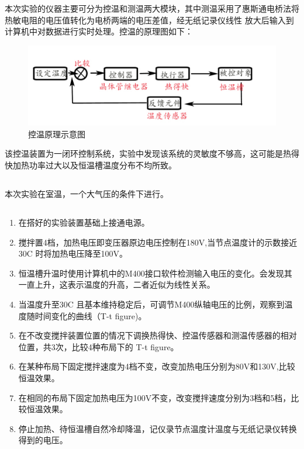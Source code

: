 ﻿\documentclass[10.5pt]{ctexart}
\begin{document}
本次实验的仪器主要可分为控温和测温两大模块，其中测温采用了惠斯通电桥法将热敏电阻的电压值转化为电桥两端的电压差值，经无纸记录仪线性
放大后输入到计算机中对数据进行实时处理。控温的原理图如下：
\begin{figure}[!ht]
\centering
\caption{控温原理示意图}
\includegraphics[width=400pt]{PrincipleFigure01.pdf}
\end{figure}


该控温装置为一闭环控制系统，实验中发现该系统的灵敏度不够高，这可能是热得快加热功率过大以及恒温槽温度分布不均所致。
\subsection{\textbf{}}
本次实验在室温，一个大气压的条件下进行。
\subsection{\textbf{}}
\begin{enumerate}
\item 在搭好的实验装置基础上接通电源。
\item 搅拌置4档，加热电压即变压器原边电压控制在180V,当节点温度计的示数接近30\degree C 时将加热电压降至100V。
\item 恒温槽升温时使用计算机中的M400接口软件检测输入电压的变化。会发现其一直上升，这表示温度的升高，二者近似为线性关系。
\item 当温度升至30\degree C 且基本维持稳定后，可调节M400纵轴电压的比例，观察到温度随时间变化的曲线（T-t figure)。
\label{MYTtFigure}
\item 在不改变搅拌装置位置的情况下调换热得快、控温传感器和测温传感器的相对位置，共3次，比较4种布局下的 T-t figure。
\item 在某种布局下固定搅拌速度为4档不变，改变加热电压分别为80V和130V,比较恒温效果。
\item 在相同的布局下固定加热电压为100V不变，改变搅拌速度分别为3档和5档，比较恒温效果。
\item 停止加热、待恒温槽自然冷却降温，记仪录节点温度计温度与无纸记录仪转换得到的电压。
\end{enumerate}
\end{document}
